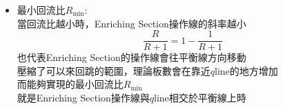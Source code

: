 \documentclass[../main.tex]{subfiles}
\begin{document}
\begin{itemize}
\begin{itemize}
\begin{itemize}
      \begin{equation}
        \frac{x_{N_{\text{min}}-1}}{1-x_{N_{\text{min}}-1}} = \alpha_{AB}\frac{x_{W}}{1-x_{W}}
      \end{equation}
      將上述所有式子相乘，得到:
      \begin{equation}
        \frac{x_D}{1-x_D} = \alpha_{AB}^{N_{\text{min}}} \frac{x_N}{1-x_N}
      \end{equation}
      整理後即得到Fenske equation\\
      但由於$x_N$是未知的，故理論板數可以加上Reboiler\\
      因為Reboiler的出料是已知的$x_W$\\
      代入上式
      \begin{equation}
        \frac{x_D}{1-x_D} = \alpha_{AB}^{N_{\text{min}}} \frac{x_W}{1-x_W}
      \end{equation}
      取對數:
      \begin{align}
        \log\left(
          \frac{x_D}{1-x_D}
        \right) &= N_{\text{min}}\log(\alpha_{AB}) + \log\left(
          \frac{x_W}{1-x_W}
        \right) \nonumber\\
        \implies N_{\text{min}} &= \frac{\log\left[\frac{x_D}{1-x_D}\cdot\frac{1-x_W}{x_W}\right]}{\log(\alpha_{AB})}
      \end{align}
      \item 最小回流比$R_{\text{min}}$:\\
      當回流比越小時，Enriching Section操作線的斜率越小
      \begin{equation}
        \frac{R}{R+1}= 1 - \frac{1}{R+1}
      \end{equation}
      也代表Enriching Section的操作線會往平衡線方向移動\\
      壓縮了可以來回跳的範圍，理論板數會在靠近$q$line的地方增加\\
      而能夠實現的最小回流比$R_{\text{min}}$\\
      就是Enriching Section操作線與$q$line相交於平衡線上時
      \begin{figure}[H]
        \centering
\end{figure}
\end{itemize}
\end{itemize}
\end{itemize}
\end{document}
